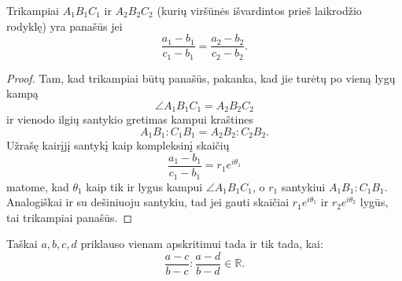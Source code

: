 \documentclass[11pt,a4paper,twoside]{book}
\begin{document}
\begin{teig}
  Trikampiai $A_1B_1C_1$ ir $A_2B_2C_2$ (kurių viršūnės išvardintos prieš
  laikrodžio rodyklę) yra panašūs jei
  $$
  \frac{a_1-b_1}{c_1-b_1} = \frac{a_2-b_2}{c_2-b_2}.
  $$
\end{teig}

\begin{proof}
  Tam, kad trikampiai būtų panašūs, pakanka, kad jie turėtų po vieną lygų kampą
  $$
  \angle A_1B_1C_1 = A_2B_2C_2
  $$
  ir vienodo ilgių santykio gretimas kampui kraštines
  $$
  A_1B_1:C_1B_1 = A_2B_2:C_2B_2.
  $$
  Užrašę kairįjį santykį kaip kompleksinį skaičių
  $$
  \frac{a_1-b_1}{c_1-b_1} = r_1e^{i\theta_1}
  $$
  matome, kad $\theta_1$ kaip tik ir lygus kampui $\angle A_1B_1C_1$, o
  $r_1$ santykiui $A_1B_1:C_1B_1$. Analogiškai ir su dešiniuoju santykiu, tad
  jei gauti skaičiai $r_1e^{i\theta_1}$ ir $r_2e^{i\theta_2}$ lygūs, tai
  trikampiai panašūs.
\end{proof}

\begin{thm}
Taškai $a, b, c, d$ priklauso vienam apskritimui tada ir tik tada, kai: 
$$\frac{a - c}{b - c}:\frac{a-d}{b-d}\in\mathbb{R}.$$
\end{thm}
\end{document}

